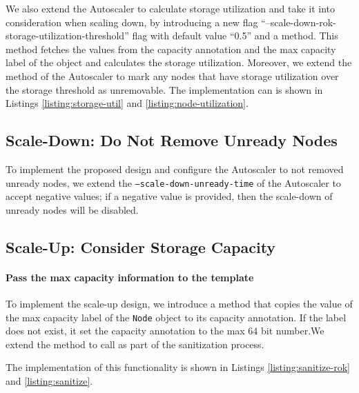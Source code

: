 We also extend the Autoscaler to calculate storage utilization and take it into
consideration when scaling down, by introducing a new flag
``--scale-down-rok-storage-utilization-threshold'' flag with default value
``0.5'' and a  method. This method
fetches the values from the capacity annotation and the max capacity label of
the  object and calculates the storage utilization. Moreover, we extend
the  method of the Autoscaler to mark any nodes that
have storage utilization over the storage threshold as unremovable. The
implementation can is shown in Listings \ref{listing:storage-util} and
\ref{listing:node-utilization}.





\subsection{Scale-Down: Do Not Remove Unready Nodes}

To implement the proposed design and configure the Autoscaler to not removed
unready nodes, we extend the \texttt{--scale-down-unready-time} of the
Autoscaler to accept negative values; if a negative value is provided, then the
scale-down of unready nodes will be disabled.

\subsection{Scale-Up: Consider Storage Capacity}

\paragraph*{Pass the max capacity information to the template}
To implement the scale-up design, we introduce a method
 that copies the value of the max capacity
label of the \texttt{Node} object to its capacity annotation. If the label does
not exist, it set the capacity annotation to the max 64 bit number.We extend the
 method to call  as
part of the sanitization process.

The implementation of this functionality is shown in Listings
\ref{listing:sanitize-rok} and \ref{listing:sanitize}.


